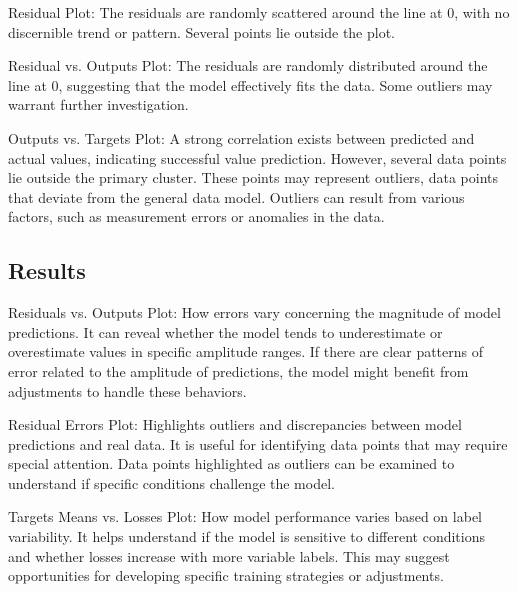 Residual Plot: The residuals are randomly scattered around the line at 0, with no discernible trend or pattern. Several points lie outside the plot.

Residual vs. Outputs Plot: The residuals are randomly distributed around the line at 0, suggesting that the model effectively fits the data. Some outliers may warrant further investigation.

Outputs vs. Targets Plot: A strong correlation exists between predicted and actual values, indicating successful value prediction. However, several data points lie outside the primary cluster. These points may represent outliers, data points that deviate from the general data model. Outliers can result from various factors, such as measurement errors or anomalies in the data.

\subsection{Results}
\label{sec:results}


Residuals vs. Outputs Plot:
How errors vary concerning the magnitude of model predictions. It can reveal whether the model tends to underestimate or overestimate values in specific amplitude ranges.
If there are clear patterns of error related to the amplitude of predictions, the model might benefit from adjustments to handle these behaviors.

Residual Errors Plot:
Highlights outliers and discrepancies between model predictions and real data. It is useful for identifying data points that may require special attention.
Data points highlighted as outliers can be examined to understand if specific conditions challenge the model.

Targets Means vs. Losses Plot:
How model performance varies based on label variability.
It helps understand if the model is sensitive to different conditions and whether losses increase with more variable labels. This may suggest opportunities for developing specific training strategies or adjustments.


